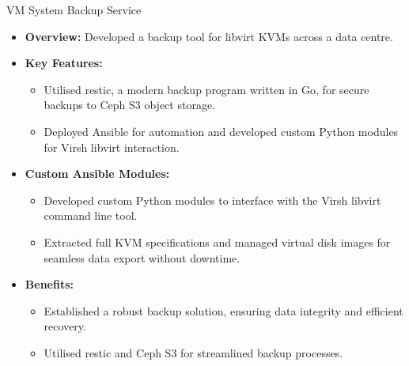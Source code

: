 \documentclass[10pt]{beamer}
\begin{document}
  \begin{frame}{VM System Backup Service}
    \begin{itemize}
      \item \textbf{Overview:} Developed a backup tool for libvirt KVMs across
      a data centre.
  
      \item \textbf{Key Features:}
        \begin{itemize}
          \item Utilised restic, a modern backup program written in Go, for
          secure backups to Ceph S3 object storage.
          \item Deployed Ansible for automation and developed custom Python
          modules for Virsh libvirt interaction.
        \end{itemize}
  
      \item \textbf{Custom Ansible Modules:}
        \begin{itemize}
          \item Developed custom Python modules to interface with the Virsh
          libvirt command line tool.
          \item Extracted full KVM specifications and managed virtual disk
          images for seamless data export without downtime.
        \end{itemize}
  
      \item \textbf{Benefits:}
        \begin{itemize}
          \item Established a robust backup solution, ensuring data integrity
          and efficient recovery.
          \item Utilised restic and Ceph S3 for streamlined backup processes.
        \end{itemize}
    \end{itemize}
  \end{frame}
\end{document}

